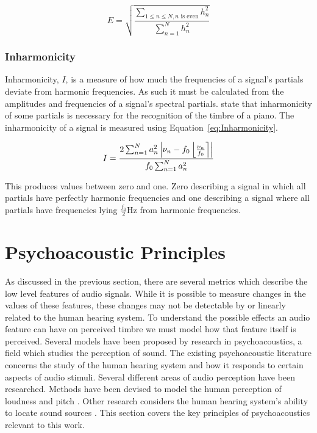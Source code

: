 			\begin{equation}
				E = \sqrt{\frac{\sum_{1 \leq n \leq N, n \text{ is even}} h_{n}^{2}}
					       {\sum_{n = 1}^{N} h_{n}^{2}}}
				\label{eq:Evenness}
			\end{equation}

		\subsubsection*{Inharmonicity}
			Inharmonicity, $I$, is a measure of how much the frequencies of a signal's partials deviate from
			harmonic frequencies. As such it must be calculated from the amplitudes and frequencies of a
			signal's spectral partials. \citet{fletcher1962quality} state that inharmonicity of some partials
			is necessary for the recognition of the timbre of a piano. The inharmonicity of a signal is
			measured using Equation~\ref{eq:Inharmonicity}.
			
			\begin{equation}
				I = \frac{2\sum_{n = 1}^{N}a_{n}^{2}
					   \left|\nu_{n} - f_{0}\left\lfloor\frac{\nu_{n}}{f_{0}}\right\rceil\right|}
					   {f_{0}\sum_{n = 1}^{N} a_{n}^{2}}
				\label{eq:Inharmonicity}
			\end{equation}

			This produces values between zero and one. Zero describing a signal in which all partials have
			perfectly harmonic frequencies and one describing a signal where all partials have frequencies
			lying $\frac{f_{0}}{2}$Hz from harmonic frequencies.

\section{Psychoacoustic Principles}
\label{sec:Timbre-PsychoacousticPrinciples}
	As discussed in the previous section, there are several metrics which describe the low level features of audio
	signals. While it is possible to measure changes in the values of these features, these changes may not be
	detectable by or linearly related to the human hearing system. To understand the possible effects an audio feature
	can have on perceived timbre we must model how that feature itself is perceived. Several models have been proposed
	by research in psychoacoustics, a field which studies the perception of sound. The existing psychoacoustic
	literature concerns the study of the human hearing system and how it responds to certain aspects of audio stimuli.
	Several different areas of audio perception have been researched. Methods have been devised to model the human
	perception of loudness \citep{moore1997a} and pitch \citep{gerhard2003pitch}. Other research considers the human
	hearing system's ability to locate sound sources \citep{blauert1997spatial}. This section covers the key principles
	of psychoacoustics relevant to this work.

